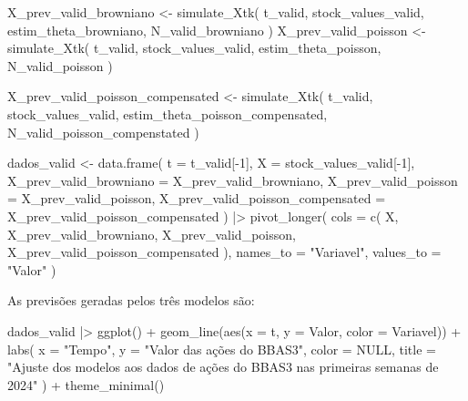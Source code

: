 \documentclass[
  letterpaper,
  DIV=11,
  numbers=noendperiod]{scrreprt}
\newenvironment{Shaded}{\begin{snugshade}}{\end{snugshade}}
\newcommand{\AttributeTok}[1]{\textcolor[rgb]{0.40,0.45,0.13}{#1}}
\newcommand{\ConstantTok}[1]{\textcolor[rgb]{0.56,0.35,0.01}{#1}}
\newcommand{\DecValTok}[1]{\textcolor[rgb]{0.68,0.00,0.00}{#1}}
\newcommand{\FunctionTok}[1]{\textcolor[rgb]{0.28,0.35,0.67}{#1}}
\newcommand{\NormalTok}[1]{\textcolor[rgb]{0.00,0.23,0.31}{#1}}
\newcommand{\OtherTok}[1]{\textcolor[rgb]{0.00,0.23,0.31}{#1}}
\newcommand{\SpecialCharTok}[1]{\textcolor[rgb]{0.37,0.37,0.37}{#1}}
\newcommand{\StringTok}[1]{\textcolor[rgb]{0.13,0.47,0.30}{#1}}
\begin{document}
\begin{Shaded}
\begin{Highlighting}[]
\NormalTok{X\_prev\_valid\_browniano }\OtherTok{\textless{}{-}} \FunctionTok{simulate\_Xtk}\NormalTok{(}
\NormalTok{    t\_valid,}
\NormalTok{    stock\_values\_valid,}
\NormalTok{    estim\_theta\_browniano,}
\NormalTok{    N\_valid\_browniano}
\NormalTok{)}
\NormalTok{X\_prev\_valid\_poisson }\OtherTok{\textless{}{-}} \FunctionTok{simulate\_Xtk}\NormalTok{(}
\NormalTok{    t\_valid,}
\NormalTok{    stock\_values\_valid,}
\NormalTok{    estim\_theta\_poisson,}
\NormalTok{    N\_valid\_poisson}
\NormalTok{)}

\NormalTok{X\_prev\_valid\_poisson\_compensated }\OtherTok{\textless{}{-}}
    \FunctionTok{simulate\_Xtk}\NormalTok{(}
\NormalTok{        t\_valid,}
\NormalTok{        stock\_values\_valid,}
\NormalTok{        estim\_theta\_poisson\_compensated,}
\NormalTok{        N\_valid\_poisson\_compenstated}
\NormalTok{    )}

\NormalTok{dados\_valid }\OtherTok{\textless{}{-}} \FunctionTok{data.frame}\NormalTok{(}
    \AttributeTok{t =}\NormalTok{ t\_valid[}\SpecialCharTok{{-}}\DecValTok{1}\NormalTok{],}
    \AttributeTok{X =}\NormalTok{ stock\_values\_valid[}\SpecialCharTok{{-}}\DecValTok{1}\NormalTok{],}
    \AttributeTok{X\_prev\_valid\_browniano =}\NormalTok{ X\_prev\_valid\_browniano,}
    \AttributeTok{X\_prev\_valid\_poisson =}\NormalTok{ X\_prev\_valid\_poisson,}
    \AttributeTok{X\_prev\_valid\_poisson\_compensated =}\NormalTok{ X\_prev\_valid\_poisson\_compensated}
\NormalTok{) }\SpecialCharTok{|\textgreater{}}
    \FunctionTok{pivot\_longer}\NormalTok{(}
        \AttributeTok{cols =} \FunctionTok{c}\NormalTok{(}
\NormalTok{            X,}
\NormalTok{            X\_prev\_valid\_browniano,}
\NormalTok{            X\_prev\_valid\_poisson,}
\NormalTok{            X\_prev\_valid\_poisson\_compensated}
\NormalTok{        ),}
        \AttributeTok{names\_to =} \StringTok{"Variavel"}\NormalTok{,}
        \AttributeTok{values\_to =} \StringTok{"Valor"}
\NormalTok{    )}
\end{Highlighting}
\end{Shaded}

As previsões geradas pelos três modelos são:

\begin{Shaded}
\begin{Highlighting}[]
\NormalTok{dados\_valid }\SpecialCharTok{|\textgreater{}}
    \FunctionTok{ggplot}\NormalTok{() }\SpecialCharTok{+}
    \FunctionTok{geom\_line}\NormalTok{(}\FunctionTok{aes}\NormalTok{(}\AttributeTok{x =}\NormalTok{ t, }\AttributeTok{y =}\NormalTok{ Valor, }\AttributeTok{color =}\NormalTok{ Variavel)) }\SpecialCharTok{+}
    \FunctionTok{labs}\NormalTok{(}
        \AttributeTok{x =} \StringTok{"Tempo"}\NormalTok{,}
        \AttributeTok{y =} \StringTok{"Valor das ações do BBAS3"}\NormalTok{,}
        \AttributeTok{color =} \ConstantTok{NULL}\NormalTok{,}
        \AttributeTok{title =} \StringTok{"Ajuste dos modelos aos dados}
\StringTok{          de ações do BBAS3 nas primeiras semanas de 2024"}
\NormalTok{    ) }\SpecialCharTok{+}
    \FunctionTok{theme\_minimal}\NormalTok{()}
\end{Highlighting}
\end{Shaded}
\end{document}
